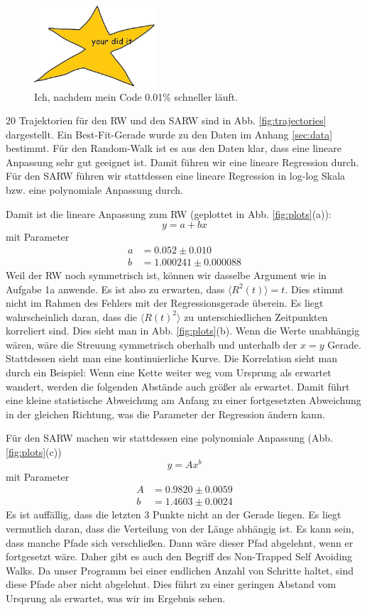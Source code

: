 \documentclass[prb,12pt]{revtex4-2}
\theoremstyle{definition}
\theoremstyle{definition}
\begin{document}
\begin{figure}[H]
	\centering
	\includegraphics[width=0.4\textwidth]{your did it.jpeg}
	\caption{Ich, nachdem mein Code 0.01\% schneller läuft.}
\end{figure}

20 Trajektorien für den RW und den SARW sind in Abb. \ref{fig:trajectories} dargestellt. Ein Best-Fit-Gerade wurde zu den Daten im Anhang \ref{sec:data} bestimmt. F\"{u}r den Random-Walk ist es aus den Daten klar, dass eine lineare Anpassung sehr gut geeignet ist. Damit führen wir eine lineare Regression durch. F\"{u}r den SARW f\"{u}hren wir stattdessen eine lineare Regression in log-log Skala bzw. eine polynomiale Anpassung durch.

Damit ist die lineare Anpassung zum RW (geplottet in Abb. \ref{fig:plots}(a)):
\[y = a + bx\]
mit Parameter
\begin{align*}
	a &= 0.052\pm 0.010\\
	b &= 1.000241\pm 0.000088
\end{align*}
Weil der RW noch symmetrisch ist, können wir dasselbe Argument wie in Aufgabe 1a anwende. Es ist also zu erwarten, dass $\langle R^2(t)\rangle = t$. Dies stimmt nicht im Rahmen des Fehlers mit der Regressionsgerade überein. Es liegt wahrscheinlich daran, dass die $\langle R(t)^2\rangle$ zu unterschiedlichen Zeitpunkten korreliert sind. Dies sieht man in Abb. \ref{fig:plots}(b). Wenn die Werte unabhängig wären, wäre die Streuung symmetrisch oberhalb und unterhalb der $x=y$ Gerade. Stattdessen sieht man eine kontinuierliche Kurve. Die Korrelation sieht man durch ein Beispiel: Wenn eine Kette weiter weg vom Ursprung als erwartet wandert, werden die folgenden Abstände auch größer als erwartet. Damit führt eine kleine statistische Abweichung am Anfang zu einer fortgesetzten Abweichung in der gleichen Richtung, was die Parameter der Regression ändern kann.

F\"{u}r den SARW machen wir stattdessen eine polynomiale Anpassung (Abb. \ref{fig:plots}(c))
\[y = A x^b\]
mit Parameter
\begin{align*}
	A &= 0.9820\pm 0.0059\\
	b &=1.4603\pm 0.0024
\end{align*}
Es ist auffällig, dass die letzten 3 Punkte nicht an der Gerade liegen. Es liegt vermutlich daran, dass die Verteilung von der Länge abhängig ist. Es kann sein, dass manche Pfade sich verschließen. Dann wäre dieser Pfad abgelehnt, wenn er fortgesetzt wäre. Daher gibt es auch den Begriff des Non-Trapped Self Avoiding Walks. Da unser Programm bei einer endlichen Anzahl von Schritte haltet, sind diese Pfade aber nicht abgelehnt. Dies führt zu einer geringen Abstand vom Ursprung als erwartet, was wir im Ergebnis sehen. 
\end{document}
